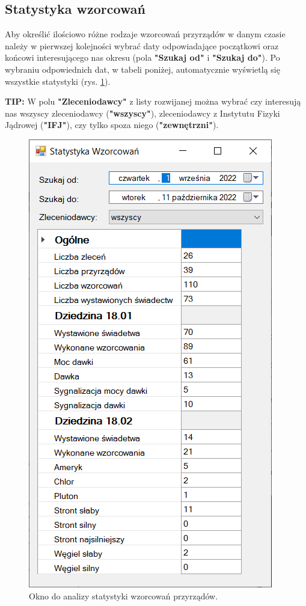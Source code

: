 \subsection{Statystyka wzorcowań}
\label{stat_wzor}

Aby określić ilościowo różne rodzaje wzorcowań przyrządów w danym czasie należy w pierwszej kolejności wybrać daty odpowiadające początkowi oraz końcowi interesującego nas okresu (pola \textbf{"Szukaj od"} i \textbf{"Szukaj do"}). Po wybraniu odpowiednich dat, w tabeli poniżej, automatycznie wyświetlą się wszystkie statystyki (rys. \ref{statystykaWzorcowan}).

\textbf{TIP:} W polu \textbf{"Zleceniodawcy"} z listy rozwijanej można wybrać czy interesują nas wszyscy zleceniodawcy (\textbf{"wszyscy"}), zleceniodawcy z Instytutu Fizyki Jądrowej (\textbf{"IFJ"}), czy tylko spoza niego (\textbf{"zewnętrzni"}).

\begin{figure}[htb]
	\centering
	\includegraphics{obrazki/Wyszukiwanie/statystyka_wzorcowan.png}
	\caption{Okno do analizy statystyki wzorcowań przyrządów.}
	\label{statystykaWzorcowan}
\end{figure}

